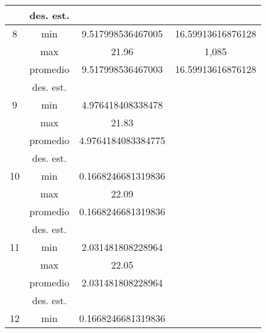 \documentclass{report}
\begin{document}
\begin{table}[ht]
\begin{tabular}{|c|c|c|c|}
                              & des. est.                   &            &        \\ \hline
        8                     & min                         &      9.517998536467005      &    16.59913616876128    \\ \cline{2-4} 
                              & max                         &     21.96       &    1,085    \\ \cline{2-4} 
                              & promedio                    &     9.517998536467003       &   16.59913616876128     \\ \cline{2-4} 
                              & des. est.                   &            &        \\ \hline
        9                     & min                         &      4.976418408338478      &        \\ \cline{2-4} 
                              & max                         &      21.83      &        \\ \cline{2-4} 
                              & promedio                    &     4.9764184083384775       &        \\ \cline{2-4} 
                              & des. est.                   &            &        \\ \hline
        10                    & min                         &      0.1668246681319836      &        \\ \cline{2-4} 
                              & max                         &      22.09      &        \\ \cline{2-4} 
                              & promedio                    &      0.1668246681319836      &        \\ \cline{2-4} 
                              & des. est.                   &            &        \\ \hline
        11                    & min                         &      2.031481808228964      &        \\ \cline{2-4} 
                              & max                         &     22.05       &        \\ \cline{2-4} 
                              & promedio                    &       2.031481808228964     &        \\ \cline{2-4} 
                              & des. est.                   &            &        \\ \hline
        12                    & min                         &     0.1668246681319836       &        \\ \cline{2-4} 

\end{tabular}
\end{table}
\end{document}

